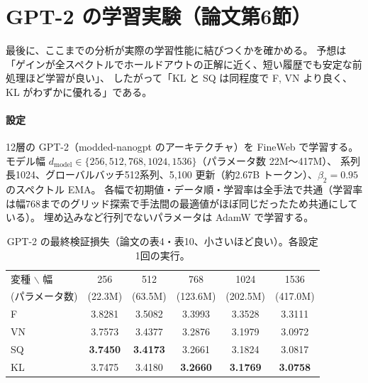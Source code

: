 \documentclass[a4paper,11pt]{ltjsarticle}
\theoremstyle{definition}
\theoremstyle{plain}
\begin{document}
\section{GPT-2 の学習実験（論文第6節）}\label{sec:gpt2}

最後に、ここまでの分析が実際の学習性能に結びつくかを確かめる。
予想は「ゲインが全スペクトルでホールドアウトの正解に近く、短い履歴でも安定な前処理ほど学習が良い」、
したがって「KL と SQ は同程度で F, VN より良く、KL がわずかに優れる」である。

\paragraph{設定}
12層の GPT-2（modded-nanogpt のアーキテクチャ）を FineWeb で学習する。
モデル幅 $d_{\mathrm{model}}\in\{256, 512, 768, 1024, 1536\}$（パラメータ数 22M〜417M）、
系列長1024、グローバルバッチ512系列、5{,}100 更新（約2.67B トークン）、$\beta_2 = 0.95$ のスペクトル EMA。
各幅で初期値・データ順・学習率は全手法で共通（学習率は幅768までのグリッド探索で手法間の最適値がほぼ同じだったため共通にしている）。
埋め込みなど行列でないパラメータは AdamW で学習する。

\begin{table}[t]
\centering
\caption{GPT-2 の最終検証損失（論文の表4・表10、小さいほど良い）。各設定1回の実行。}
\label{tab:gpt2}
\begin{tabular}{lccccc}
\toprule
変種 $\backslash$ 幅 & 256 & 512 & 768 & 1024 & 1536\\
(パラメータ数) & (22.3M) & (63.5M) & (123.6M) & (202.5M) & (417.0M)\\\midrule
F  & 3.8281 & 3.5082 & 3.3993 & 3.3528 & 3.3111\\
VN & 3.7573 & 3.4377 & 3.2876 & 3.1979 & 3.0972\\
SQ & \textbf{3.7450} & \textbf{3.4173} & 3.2661 & 3.1824 & 3.0817\\
KL & 3.7475 & 3.4180 & \textbf{3.2660} & \textbf{3.1769} & \textbf{3.0758}\\
\bottomrule
\end{tabular}
\end{table}
\end{document}
